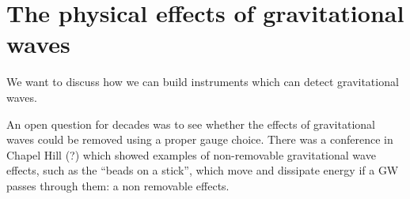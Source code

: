 \documentclass[main.tex]{subfiles}
\begin{document}

\section{The physical effects of gravitational waves}

We want to discuss how we can build instruments which can detect gravitational waves. 

An open question for decades was to see whether the effects of gravitational waves could be removed using a proper gauge choice. 
There was a conference in Chapel Hill (?) which showed examples of non-removable gravitational wave effects, such as the ``beads on a stick'', which move and dissipate energy if a GW passes through them: a non removable effects. 
\end{document}
